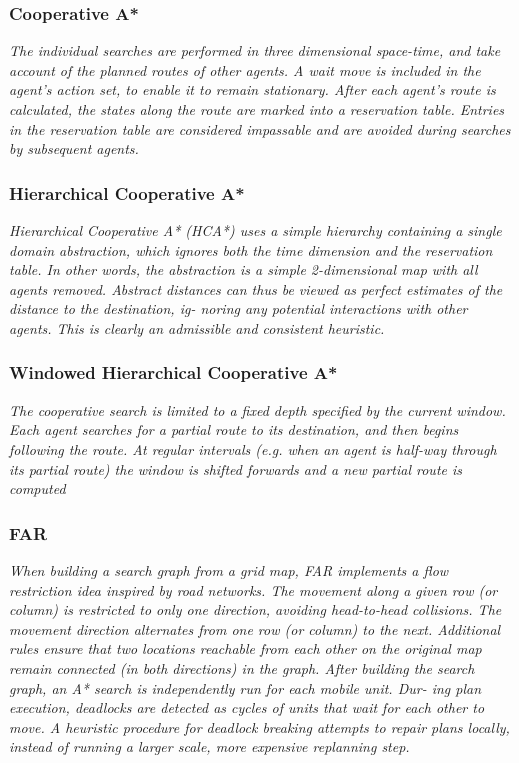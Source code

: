 \documentclass[a4paper,11pt]{article}
\begin{document}
\subsubsection*{Cooperative A*}

\textit{The individual searches are performed in three dimensional space-time, and take account of the planned routes of other agents. A wait move is included in the agent’s action set, to enable it to remain stationary. After each agent’s route is calculated, the states along the route are marked into a reservation table. Entries in the reservation table are considered impassable and are avoided during searches by subsequent agents.
}
\subsubsection*{Hierarchical Cooperative A*}
\textit{Hierarchical Cooperative A* (HCA*) uses a simple hierarchy containing a single domain abstraction, which ignores both the time dimension and the reservation table. In other words, the abstraction is a simple 2-dimensional map with all agents removed. Abstract distances can thus be viewed as perfect estimates of the distance to the destination, ig- noring any potential interactions with other agents. This is clearly an admissible and consistent heuristic.}


\subsubsection*{Windowed Hierarchical Cooperative A*}
\textit{The cooperative search is limited to a fixed depth specified by the current window. Each agent searches for a partial route to its destination, and then begins following the route. At regular intervals (e.g. when an agent is half-way through its partial route) the window is shifted forwards and a new partial route is computed}


\subsubsection{FAR}
\cite{wang2008fast}

\textit{When building a search graph from a grid map, FAR implements a flow restriction idea inspired by road networks. The movement along a given row (or column) is restricted to only one direction, avoiding head-to-head collisions. The movement direction alternates from one row (or column) to the next. Additional rules ensure that two locations reachable from each other on the original map remain connected (in both directions) in the graph. After building the search graph, an A* search is independently run for each mobile unit. Dur- ing plan execution, deadlocks are detected as cycles of units that wait for each other to move. A heuristic procedure for deadlock breaking attempts to repair plans locally, instead of running a larger scale, more expensive replanning step.}
\end{document}
